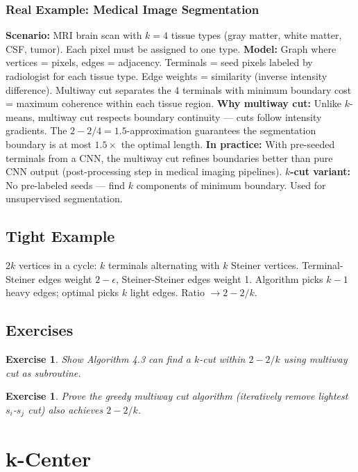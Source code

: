 \documentclass[11pt,oneside]{book}
\newtheorem{exercise}[theorem]{Exercise}
\begin{document}
\subsection*{Real Example: Medical Image Segmentation}
\textbf{Scenario:} MRI brain scan with $k=4$ tissue types (gray matter, white matter, CSF, tumor). Each pixel must be assigned to one type.
\textbf{Model:} Graph where vertices = pixels, edges = adjacency. Terminals = seed pixels labeled by radiologist for each tissue type. Edge weights = similarity (inverse intensity difference). Multiway cut separates the 4 terminals with minimum boundary cost = maximum coherence within each tissue region.
\textbf{Why multiway cut:} Unlike $k$-means, multiway cut respects boundary continuity — cuts follow intensity gradients. The $2-2/4 = 1.5$-approximation guarantees the segmentation boundary is at most $1.5\times$ the optimal length.
\textbf{In practice:} With pre-seeded terminals from a CNN, the multiway cut refines boundaries better than pure CNN output (post-processing step in medical imaging pipelines).
\textbf{$k$-cut variant:} No pre-labeled seeds — find $k$ components of minimum boundary. Used for unsupervised segmentation.

\section{Tight Example}

$2k$ vertices in a cycle: $k$ terminals alternating with $k$ Steiner vertices. Terminal-Steiner edges weight $2-\epsilon$, Steiner-Steiner edges weight 1. Algorithm picks $k-1$ heavy edges; optimal picks $k$ light edges. Ratio $\to 2-2/k$.

\section{Exercises}
\begin{exercise}
Show Algorithm 4.3 can find a $k$-cut within $2-2/k$ using multiway cut as subroutine.
\end{exercise}
\begin{exercise}
Prove the greedy multiway cut algorithm (iteratively remove lightest $s_i$-$s_j$ cut) also achieves $2-2/k$.
\end{exercise}

\setcounter{chapter}{4}
\chapter{k-Center}
\label{ch:kcenter}
\end{document}

